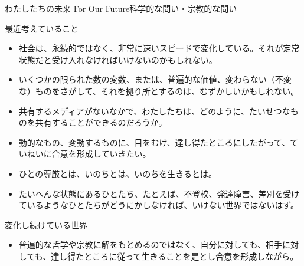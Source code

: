 \documentclass[10pt, dvipdfmx]{beamer}
\begin{document}
\begin{frame}{わたしたちの未来 }{For Our Future\hfill 科学的な問い・宗教的な問い}

\begin{block}{最近考えていること}
\begin{itemize}
\item 社会は、永続的ではなく、非常に速いスピードで変化している。それが定常状態だと受け入れなければいけないのかもしれない。
\item いくつかの限られた数の変数、または、普遍的な価値、変わらない（不変な）ものをさがして、それを拠り所とするのは、むずかしいかもしれない。
\item 共有するメディアがないなかで、わたしたちは、どのように、たいせつなものを共有することができるのだろうか。
\item 動的なもの、変動するものに、目をむけ、達し得たところにしたがって、ていねいに合意を形成していきたい。
\item ひとの尊厳とは、いのちとは、いのちを生きるとは。
\item たいへんな状態にあるひとたち、たとえば、不登校、発達障害、差別を受けているようなひとたちがどうにかしなければ、いけない世界ではないはず。
\end{itemize}
\end{block}

\begin{alertblock}{変化し続けている世界}
\begin{itemize}
\item 普遍的な哲学や宗教に解をもとめるのではなく、自分に対しても、相手に対しても、達し得たところに従って生きることを是とし合意を形成しながら。
\end{itemize}

\end{alertblock}

\end{frame}

%


\end{document}
